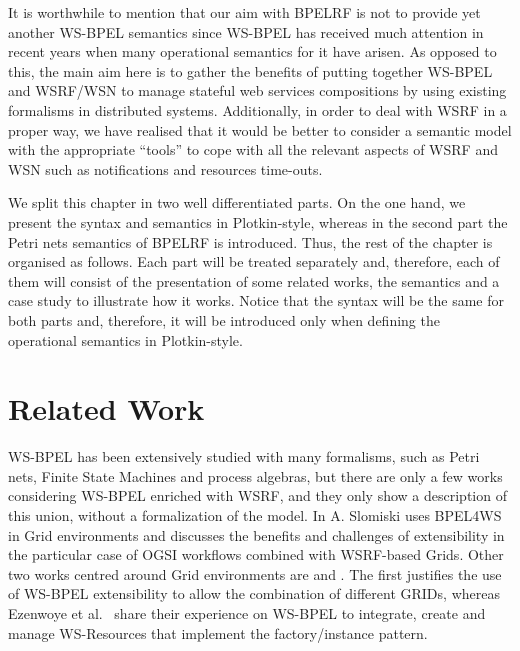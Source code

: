 It is worthwhile to mention that our aim with BPELRF is not to provide yet another WS-BPEL semantics since WS-BPEL has received much attention in recent years when many operational semantics for it have arisen. As opposed to this, the main aim here is to gather the benefits of putting together WS-BPEL and WSRF/WSN to manage stateful web services compositions by using existing formalisms in distributed systems. Additionally, in order to deal with WSRF in a proper way, we have realised that it would be better to consider a semantic model with the appropriate ``tools'' to cope with all the relevant aspects of WSRF and WSN such as notifications and resources time-outs. %

We split this chapter in two well differentiated parts. On the one hand, we present the syntax and semantics in Plotkin-style, whereas in the second part the Petri nets semantics of BPELRF is introduced. Thus, the rest of the chapter is organised as follows. Each part will be treated separately and, therefore, each of them will consist of the presentation of some related works, the semantics and a case study to illustrate how it works. Notice that the syntax will be the same for both parts and, therefore, it will be introduced only when defining the operational semantics in Plotkin-style.

\section*{Related Work}\label{rWork}
WS-BPEL has been extensively studied with many formalisms, such as
Petri nets, Finite State Machines and process algebras, but 
there are only a few works considering WS-BPEL enriched with 
WSRF, and they only show a description of this union, 
without a formalization of the model.
In \cite{Slomiski06} A. Slomiski uses BPEL4WS in Grid environments and discusses the
benefits and challenges of extensibility in the particular case of OGSI workflows
combined with WSRF-based Grids. Other two works centred around Grid environments are 
\cite{Leymann06} and \cite{Ezenwoye07}. The first justifies 
the use of WS-BPEL extensibility to allow the combination of different GRIDs, whereas
Ezenwoye et al.~\cite{Ezenwoye07} share their experience on WS-BPEL to integrate,
create and manage WS-Resources that implement the factory/instance pattern.

